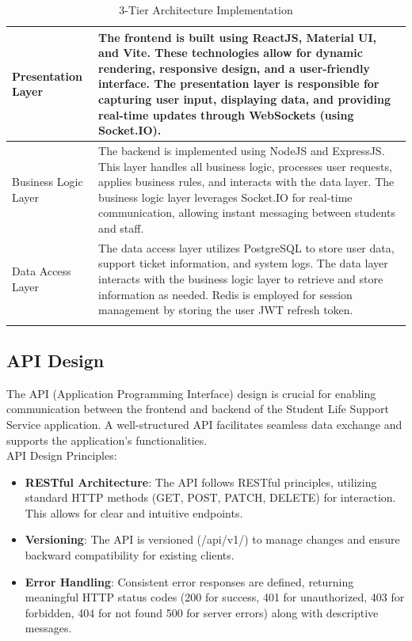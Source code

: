 	\begin{longtable}{|m{4cm}|m{13cm}|}
		\hline
		
		
		Presentation Layer & The frontend is built using ReactJS, Material UI, and Vite. These technologies allow for dynamic rendering, responsive design, and a user-friendly interface. The presentation layer is responsible for capturing user input, displaying data, and providing real-time updates through WebSockets (using Socket.IO).  \\ \hline
		
		Business Logic Layer & The backend is implemented using NodeJS and ExpressJS. This layer handles all business logic, processes user requests, applies business rules, and interacts with the data layer. The business logic layer leverages Socket.IO for real-time communication, allowing instant messaging between students and staff.  \\ \hline
		
		Data Access Layer & The data access layer utilizes PostgreSQL to store user data, support ticket information, and system logs. The data layer interacts with the business logic layer to retrieve and store information as needed. Redis is employed for session management by storing the user JWT refresh token. \\ \hline

		
		\caption{3-Tier Architecture Implementation}
		\label{tab:3-tier-implement}
		
	\end{longtable}


\subsection{API Design}
The API (Application Programming Interface) design is crucial for enabling communication between the frontend and backend of the Student Life Support Service application. A well-structured API facilitates seamless data exchange and supports the application's functionalities. \\

	API Design Principles:
	\begin{itemize}
		\item \textbf{RESTful Architecture}: The API follows RESTful principles, utilizing standard HTTP methods (GET, POST, PATCH, DELETE) for interaction. This allows for clear and intuitive endpoints.
		
		\item \textbf{Versioning}: The API is versioned (/api/v1/) to manage changes and ensure backward compatibility for existing clients.
		
		\item \textbf{Error Handling}: Consistent error responses are defined, returning meaningful HTTP status codes (200 for success, 401 for unauthorized, 403 for forbidden, 404 for not found 500 for server errors) along with descriptive messages.
	\end{itemize}
	
